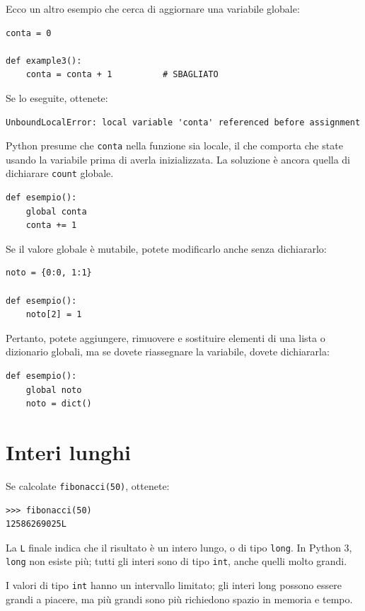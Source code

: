 \documentclass[10pt]{book}
\begin{document}
Ecco un altro esempio che cerca di aggiornare una variabile globale:

\begin{verbatim}
conta = 0

def example3():
    conta = conta + 1          # SBAGLIATO
\end{verbatim}
%
Se lo eseguite, ottenete:

\begin{verbatim}
UnboundLocalError: local variable 'conta' referenced before assignment
\end{verbatim}
%
Python presume che {\tt conta} nella funzione sia locale, il che comporta che state usando la variabile prima di averla inizializzata. La soluzione è ancora quella di dichiarare {\tt count} globale.

\begin{verbatim}
def esempio():
    global conta
    conta += 1
\end{verbatim}
%
Se il valore globale è mutabile, potete modificarlo anche senza dichiararlo:

\begin{verbatim}
noto = {0:0, 1:1}

def esempio():
    noto[2] = 1
\end{verbatim}
%
Pertanto, potete aggiungere, rimuovere e sostituire elementi di una lista o dizionario globali, ma se dovete riassegnare la variabile, dovete dichiararla:

\begin{verbatim}
def esempio():
    global noto
    noto = dict()
\end{verbatim}
%

\section{Interi lunghi}

Se calcolate {\tt fibonacci(50)}, ottenete:

\begin{verbatim}
>>> fibonacci(50)
12586269025L
\end{verbatim}
%
La {\tt L} finale indica che il risultato è un intero lungo, o di tipo {\tt long}.  In Python 3, {\tt long} non esiste più; tutti gli interi sono di tipo {\tt int}, anche quelli molto grandi.

I valori di tipo {\tt int} hanno un intervallo limitato; gli interi long possono essere grandi a piacere, ma più grandi sono più richiedono spazio in memoria e  tempo.
\end{document}
